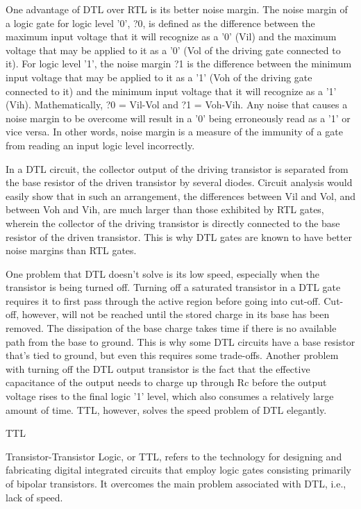 One advantage of DTL over RTL is its better noise margin. The noise margin of a logic gate for logic level '0', ?0, is defined as the difference between the maximum input voltage that it will recognize as a '0' (Vil) and the maximum voltage that may be applied to it as a '0' (Vol of the driving gate connected to it).  For logic level '1', the noise margin ?1 is the difference between the minimum input voltage that may be applied to it as a '1' (Voh of the driving gate connected to it) and the minimum input voltage that it will recognize as a '1' (Vih).  Mathematically, ?0 = Vil-Vol and ?1 = Voh-Vih. Any noise that causes a noise margin to be overcome will result in a '0' being erroneously read as a '1' or vice versa.  In other words, noise margin is a measure of the immunity of a gate from reading an input logic level incorrectly.



In a DTL circuit, the collector output of the driving transistor is separated from the base resistor of the driven transistor by several diodes.  Circuit analysis would easily show that in such an arrangement, the differences between Vil and Vol, and between Voh and Vih, are much larger than those exhibited by RTL gates, wherein the collector of the driving transistor is directly connected to the base resistor of the driven transistor.  This is why DTL gates are known to have better noise margins than RTL gates.



One problem that DTL doesn't solve is its low speed, especially when the transistor is being turned off.  Turning off a saturated transistor in a DTL gate requires it to first pass through the active region before going into cut-off.  Cut-off, however, will not be reached until the stored charge in its base has been removed. The dissipation of the base charge takes time if there is no available path from the base to ground.  This is why some DTL circuits have a base resistor that's tied to ground, but even this requires some trade-offs.  Another problem with turning off the DTL output transistor is the fact that the effective capacitance of the output needs to charge up through Rc before the output voltage rises to the final logic '1' level, which also consumes a relatively large amount of time.  TTL, however, solves the speed problem of DTL elegantly.






TTL


Transistor-Transistor Logic, or TTL, refers to the technology for designing and fabricating digital integrated circuits that employ logic gates consisting primarily of bipolar transistors.  It overcomes the main problem associated with DTL, i.e., lack of speed.






